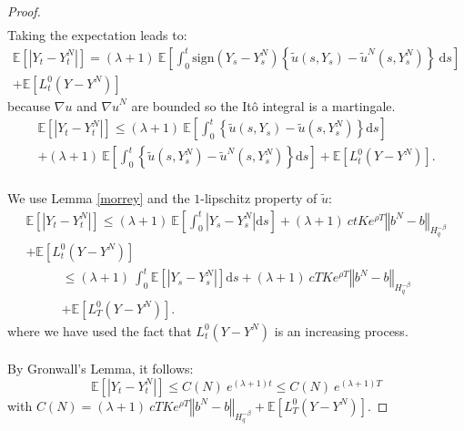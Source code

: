 \documentclass[12pt]{article}
\newcommand{\norme}[1]{\left\Vert #1\right\Vert}
\newcommand{\E}{\mathbb{E}}
\newcommand{\di}{\mathrm{d}}
\begin{document}
\begin{proof}
\begin{multline*}
     \end{multline*}    
    Taking the expectation leads to:
    \begin{multline*}
    \E\left[\left|Y_t-Y_t^N\right|\right] = (\lambda + 1)\ \E\left[\int_0^t\mathrm{sign}(Y_s-Y_s^N)\left\{\widetilde{u}\left(s,Y_s\right)-\widetilde{u}^N\left(s,Y_s^N\right)\right\}\ \di s\right]\\ + \E \left[L_t^0(Y-Y^N)\right]
    \end{multline*}
    because ${\nabla u}$ and ${\nabla u}^N$ are bounded so the Itô integral is a martingale.    
    \begin{multline*}
    \E\left[\left|Y_t-Y_t^N\right|\right]\leq (\lambda + 1)\ \E\left[\int_0^t\left\{\widetilde{u}\left(s,Y_s\right)-\widetilde{u}\left(s,Y_s^N\right)\right\} \di s\right]\\ +(\lambda + 1)\ \E\left[\int_0^t\left\{\widetilde{u}\left(s,Y_s^N\right)-\widetilde{u}^N\left(s,Y_s^N\right)\right\} \di s\right] + \E \left[L_t^0(Y-Y^N)\right].
    \end{multline*}    
    \paragraph{}
    We use Lemma \ref{morrey} and the $1$-lipschitz property of $\widetilde{u}$:
    \begin{multline*}
    \E\left[\left|Y_t-Y_t^N\right|\right]\leq (\lambda + 1)\ \E\left[\int_0^t\left|Y_s-Y_s^N\right| \di s\right] +(\lambda + 1)\ ctKe^{\rho T}\norme{b^N-b}_{H^{-\beta}_{q}}\\ + \E \left[L_t^0(Y-Y^N)\right]
    \end{multline*}    
    \begin{multline*}
    \leq (\lambda + 1)\ \int_0^t\E\left[\left|Y_s-Y_s^N\right|\right] \di s + (\lambda + 1)\ cTKe^{\rho T}\norme{b^N-b}_{H^{-\beta}_{q}}\\ + \E \left[L_T^0(Y-Y^N)\right].
    \end{multline*}
    where we have used the fact that $L_t^0(Y-Y^N)$ is an increasing process.    
    \paragraph{}
    By Gronwall's Lemma, it follows:
    \begin{equation}\label{gronwall}
    \E\left[\left|Y_t-Y_t^N\right|\right] \leq C(N)\ e^{(\lambda + 1)t}\leq C(N)\ e^{(\lambda + 1)T}
    \end{equation}
    with $C(N) = (\lambda + 1)\ cTKe^{\rho T}\norme{b^N-b}_{H^{-\beta}_{q}} + \E \left[L_T^0(Y-Y^N)\right].$      
    

\end{proof}
\end{document}
